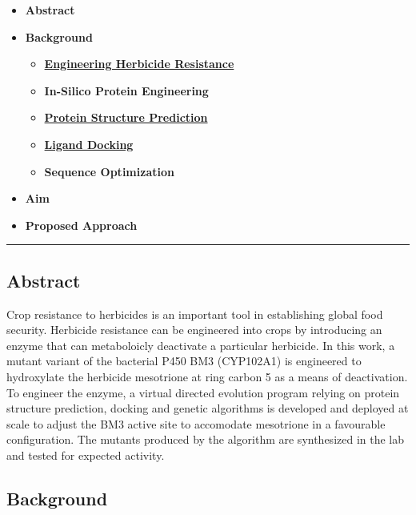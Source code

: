 \begin{itemize}
\tightlist
\item
  \textbf{Abstract}
\item
  \textbf{Background}

  \begin{itemize}
  \tightlist
  \item
    \textbf{\href{herbicide-resistance.md}{Engineering Herbicide
    Resistance}}
  \item
    \textbf{In-Silico Protein Engineering}
  \item
    \textbf{\href{protein-structure-pred.md}{Protein Structure
    Prediction}}
  \item
    \textbf{\href{docking.md}{Ligand Docking}}
  \item
    \textbf{Sequence Optimization}
  \end{itemize}
\item
  \textbf{Aim}
\item
  \textbf{Proposed Approach}
\end{itemize}

\begin{center}\rule{0.5\linewidth}{0.5pt}\end{center}

\hypertarget{abstract-1}{%
\subsection{Abstract}\label{abstract-1}}

Crop resistance to herbicides is an important tool in establishing
global food security. Herbicide resistance can be engineered into crops
by introducing an enzyme that can metaboloicly deactivate a particular
herbicide. In this work, a mutant variant of the bacterial P450 BM3
(CYP102A1) is engineered to hydroxylate the herbicide mesotrione at ring
carbon 5 as a means of deactivation. To engineer the enzyme, a virtual
directed evolution program relying on protein structure prediction,
docking and genetic algorithms is developed and deployed at scale to
adjust the BM3 active site to accomodate mesotrione in a favourable
configuration. The mutants produced by the algorithm are synthesized in
the lab and tested for expected activity.

\hypertarget{background}{%
\subsection{Background}\label{background}}


